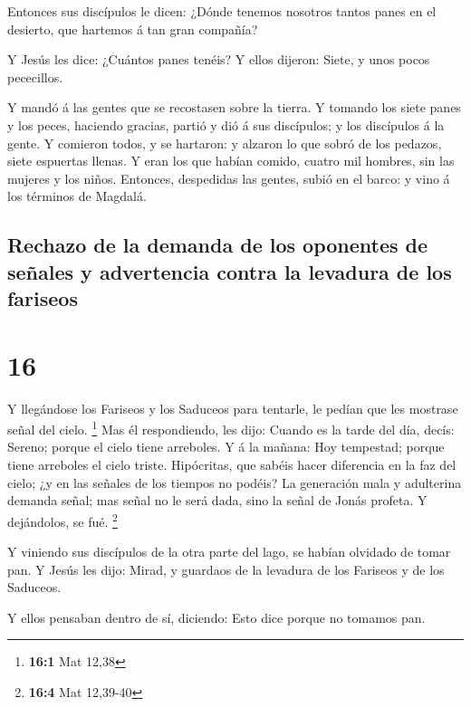  Entonces sus discípulos le dicen: ¿Dónde tenemos nosotros
tantos panes en el desierto, que hartemos á tan gran compañía?

 Y Jesús les dice: ¿Cuántos panes tenéis? Y ellos dijeron:
Siete, y unos pocos pececillos.

 Y mandó á las gentes que se recostasen sobre la tierra.
 Y tomando los siete panes y los peces, haciendo gracias,
partió y dió á sus discípulos; y los discípulos á la gente.
 Y comieron todos, y se hartaron: y alzaron lo que sobró de
los pedazos, siete espuertas llenas.  Y eran los que habían
comido, cuatro mil hombres, sin las mujeres y los niños. 
Entonces, despedidas las gentes, subió en el barco: y vino á los
términos de Magdalá.

\hypertarget{rechazo-de-la-demanda-de-los-oponentes-de-seuxf1ales-y-advertencia-contra-la-levadura-de-los-fariseos}{%
\subsection{Rechazo de la demanda de los oponentes de señales y
advertencia contra la levadura de los
fariseos}\label{rechazo-de-la-demanda-de-los-oponentes-de-seuxf1ales-y-advertencia-contra-la-levadura-de-los-fariseos}}

\hypertarget{section-15}{%
\section{16}\label{section-15}}

 Y llegándose los Fariseos y los Saduceos para tentarle, le
pedían que les mostrase señal del cielo. \footnote{\textbf{16:1} Mat
  12,38}  Mas él respondiendo, les dijo: Cuando es la tarde
del día, decís: Sereno; porque el cielo tiene arreboles.  Y
á la mañana: Hoy tempestad; porque tiene arreboles el cielo triste.
Hipócritas, que sabéis hacer diferencia en la faz del cielo; ¿y en las
señales de los tiempos no podéis?  La generación mala y
adulterina demanda señal; mas señal no le será dada, sino la señal de
Jonás profeta. Y dejándolos, se fué. \footnote{\textbf{16:4} Mat
  12,39-40}

 Y viniendo sus discípulos de la otra parte del lago, se
habían olvidado de tomar pan.  Y Jesús les dijo: Mirad, y
guardaos de la levadura de los Fariseos y de los Saduceos.

 Y ellos pensaban dentro de sí, diciendo: Esto dice porque
no tomamos pan.

